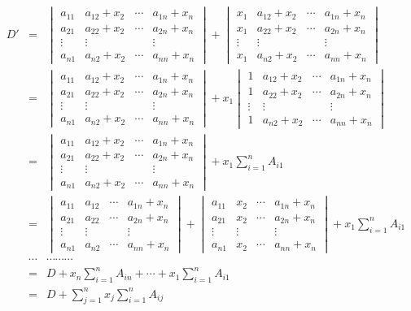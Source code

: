 \begin{eqnarray*}
D' & = & \begin{vmatrix} a_{11} & a_{12}+x_2 & \cdots & a_{1n}+x_n \\ a_{21} & a_{22}+x_2 & \cdots & a_{2n}+x_n \\ \vdots & \vdots & & \vdots \\ a_{n1} & a_{n2}+x_2 & \cdots & a_{nn}+x_n \end{vmatrix} + \begin{vmatrix} x_1 & a_{12}+x_2 & \cdots & a_{1n}+x_n \\ x_1 & a_{22}+x_2 & \cdots & a_{2n}+x_n \\ \vdots & \vdots & & \vdots \\ x_1 & a_{n2}+x_2 & \cdots & a_{nn}+x_n \end{vmatrix} \\
& = & \begin{vmatrix} a_{11} & a_{12}+x_2 & \cdots & a_{1n}+x_n \\ a_{21} & a_{22}+x_2 & \cdots & a_{2n}+x_n \\ \vdots & \vdots & & \vdots \\ a_{n1} & a_{n2}+x_2 & \cdots & a_{nn}+x_n \end{vmatrix} + x_1 \begin{vmatrix} 1 & a_{12}+x_2 & \cdots & a_{1n}+x_n \\ 1 & a_{22}+x_2 & \cdots & a_{2n}+x_n \\ \vdots & \vdots & & \vdots \\ 1 & a_{n2}+x_2 & \cdots & a_{nn}+x_n \end{vmatrix} \\
& = & \begin{vmatrix} a_{11} & a_{12}+x_2 & \cdots & a_{1n}+x_n \\ a_{21} & a_{22}+x_2 & \cdots & a_{2n}+x_n \\ \vdots & \vdots & & \vdots \\ a_{n1} & a_{n2}+x_2 & \cdots & a_{nn}+x_n \end{vmatrix} + x_1 \sum\limits_{i=1}^n A_{i1} \\
& = & \begin{vmatrix} a_{11} & a_{12} & \cdots & a_{1n}+x_n \\ a_{21} & a_{22} & \cdots & a_{2n}+x_n \\ \vdots & \vdots & & \vdots \\ a_{n1} & a_{n2} & \cdots & a_{nn}+x_n \end{vmatrix} + \begin{vmatrix} a_{11} & x_2 & \cdots & a_{1n}+x_n \\ a_{21} & x_2 & \cdots & a_{2n}+x_n \\ \vdots & \vdots & & \vdots \\ a_{n1} & x_2 & \cdots & a_{nn}+x_n \end{vmatrix} + x_1 \sum\limits_{i=1}^n A_{i1} \\
& \cdots & \cdots\cdots\cdots \\
& = & D + x_n \sum\limits_{i=1}^n A_{in} + \cdots + x_1 \sum\limits_{i=1}^n A_{i1} \\
& = & D + \sum\limits_{j=1}^n x_j \sum\limits_{i=1}^n A_{ij}
\end{eqnarray*}

